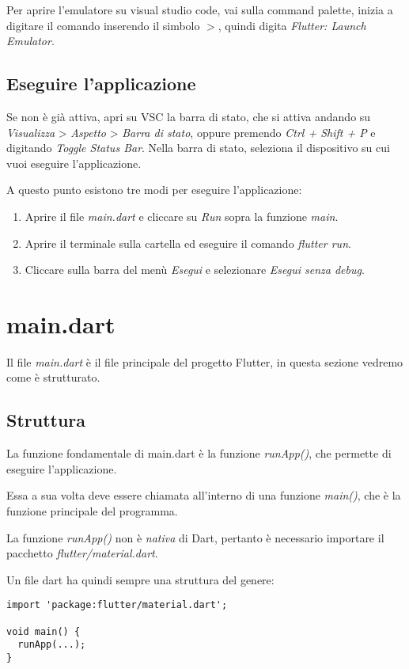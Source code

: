 \documentclass[12pt]{article}
\begin{document}
Per aprire l'emulatore su visual studio code,
vai sulla command palette, inizia a digitare il comando inserendo il simbolo 
$>$, quindi digita \textit{Flutter: Launch Emulator}.

\subsection{Eseguire l'applicazione}
Se non è già attiva, apri su VSC la barra di stato, che 
si attiva andando su \textit{Visualizza} > \textit{Aspetto} > \textit{Barra di stato},
oppure premendo \textit{Ctrl + Shift + P} e digitando \textit{Toggle Status Bar}.
Nella barra di stato, seleziona il dispositivo su cui vuoi 
eseguire l'applicazione.

A questo punto esistono tre modi per eseguire l'applicazione:
\begin{enumerate}
    \item Aprire il file \textit{main.dart} e cliccare su \textit{Run} sopra 
    la funzione \textit{main}.
    \item Aprire il terminale sulla cartella ed eseguire il comando 
    \textit{flutter run}.
    \item Cliccare sulla barra del menù \textit{Esegui} e selezionare
    \textit{Esegui senza debug}.
\end{enumerate}

\section{main.dart}
Il file \textit{main.dart} è il file principale del progetto 
Flutter, in questa sezione vedremo come è strutturato.

\subsection{Struttura}
La funzione fondamentale di main.dart è la funzione 
\textit{runApp()}, che permette di eseguire l'applicazione.

Essa a sua volta deve essere chiamata all'interno di una funzione
\textit{main()}, che è la funzione principale del programma.

La funzione \textit{runApp()} non è \textit{nativa} di Dart,
pertanto è necessario importare il pacchetto \textit{flutter/material.dart}.

Un file dart ha quindi sempre una struttura del genere:
\begin{verbatim}
import 'package:flutter/material.dart';

void main() {
  runApp(...);
}
\end{verbatim}
\end{document}
